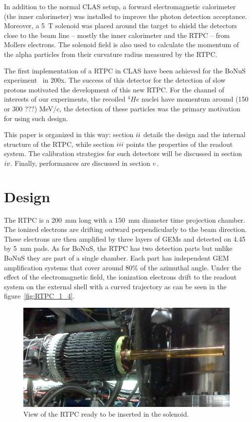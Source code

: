 \documentclass[reprint, amsmath,amssymb, aps]{revtex4-1}
\newcommand{\RNum}[1]{\uppercase\expandafter{\romannumeral #1\relax}}
\begin{document}
In addition to the normal CLAS setup, a forward electromagnetic calorimeter (the inner calorimeter) was installed to improve the photon detection acceptance. Moreover, a 5~T solenoid was placed around the target to shield the detectors close to the beam line -- mostly the inner calorimeter and the RTPC -- from Mollers electrons. The solenoid field is also used to calculate the momentum of the alpha particles from their curvature radius measured by the RTPC.

The first implementation of a RTPC in CLAS have been achieved for the BoNuS experiment~\cite{BONUS} in 200x. The success of this detector for the detection of slow protons motivated the development of this new RTPC. For the channel of interests of our experiments, the recoiled $^{4}He$ nuclei have momentum around (150 or 300 ???) MeV/c, the detection of these particles was the primary motivation for using such design. 

This paper is organized in this way: section $\RNum{2}$ details the design and the internal structure of the RTPC, while section $\RNum{3}$ points the properties of the readout system. The calibration strategies for such detectors will be discussed in section $\RNum{4}$. Finally, performances are discussed in section $\RNum{5}$.

 
\section{Design}

The RTPC is a 200~mm long with a 150~mm diameter time projection chamber. The ionized electrons are drifting outward perpendicularly to the beam direction. These electrons are then amplified by three layers of GEMs and detected on 4.45 by 5~mm pads. As for BoNuS, the RTPC has two detection parts but unlike BoNuS they are part of a single chamber. Each part has independent GEM amplification systems that cover around 80\% of the azimuthal angle. Under the effect of the electromagnetic field, the ionization electrons drift to the readout system on the external shell with a curved trajectory as can be seen in the figure~\ref{fig:RTPC_1_4}.

\begin{figure}[tb]
\centering
\includegraphics[scale=0.19]{fig/RTPC_exp.png}
\caption[]{\small\sf View of the RTPC ready to be inserted in the solenoid. } 
\label{fig:RTPC2}
\end{figure}
\end{document}

